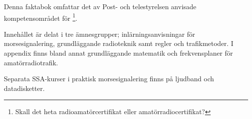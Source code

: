 \onecolumn

\begin{rev-omarbetas}
Denna faktabok omfattar det av Post- och telestyrelsen anvisade
kompetensområdet för \footnote{Skall det heta 
radioamatörcertifikat eller amatörradiocertifikat?}.

Innehållet är delat i tre ämnesgrupper; inlärningsanvisningar för
morsesignalering, grundläggande radioteknik samt regler och
trafikmetoder. I appendix finns bland annat grundläggande matematik
och frekvensplaner för amatörradiotrafik.

Separata SSA-kurser i praktisk morsesignalering finns på ljudband och
datadisketter.
\end{rev-omarbetas}

\twocolumn
